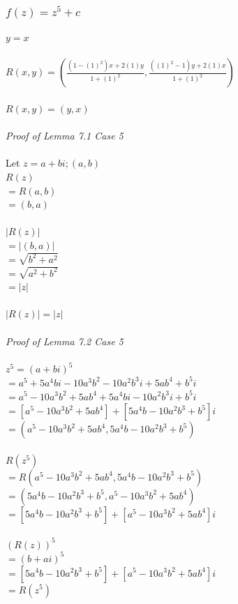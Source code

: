 \documentclass{article}
\begin{document}
\subsubsection{$f(z) = z^5 + c$}
\underline{$y=x$}                %
\\
\\
$R(x,y) = (\frac{(1-(1)^2)x+2(1)y}{1+(1)^2}, \frac{((1)^2-1)y+2(1)x}{1+(1)^2})$
\\
\\$R(x,y) = (y, x)$
\\
\\\textit{Proof of Lemma 7.1 Case 5}
\\
\\Let $z=a+bi; (a,b)$
\\$R(z)$
\\$= R(a,b)$
\\$= (b, a)$
\\
\\$|R(z)|$
\\$=|(b,a)| $
\\$= \sqrt{b^2 + a^2}$
\\$= \sqrt{a^2 + b^2}$
\\$= |z|$
\\
\\$|R(z)| = |z|$
\\
\\\textit{Proof of Lemma 7.2 Case 5}
\\
\\$z^5 = (a+bi)^5$
\\$= a^5+5a^4bi-10a^3b^2-10a^2b^3i+5ab^4+b^5i$
\\$= a^5-10a^3b^2+5ab^4+5a^4bi-10a^2b^3i+b^5i$
\\$= [a^5-10a^3b^2+5ab^4]+[5a^4b-10a^2b^3+b^5]i$
\\$= (a^5-10a^3b^2+5ab^4, 5a^4b-10a^2b^3+b^5)$
\\
\\$R(z^5)$
\\$= R(a^5-10a^3b^2+5ab^4, 5a^4b-10a^2b^3+b^5)$
\\$= (5a^4b-10a^2b^3+b^5, a^5-10a^3b^2+5ab^4)$
\\$= [5a^4b-10a^2b^3+b^5] + [a^5-10a^3b^2+5ab^4]i$
\\
\\$(R(z))^5$
\\$= (b+ai)^5$
\\$= [5a^4b-10a^2b^3+b^5] + [a^5-10a^3b^2+5ab^4]i$
\\$= R(z^5)$
\\
\end{document}
